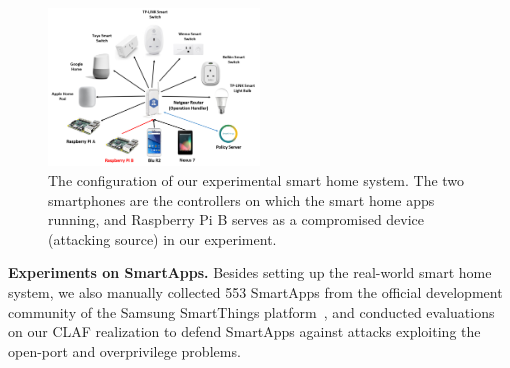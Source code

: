 \documentclass[letterpaper,12pt]{article}
\begin{document}
\begin{figure}[!htb]
        \centering
        \includegraphics[width=0.5\textwidth]{smarthomesys.png}
        \caption{The configuration of our experimental smart home system. The two smartphones are the controllers on which the smart home apps running, and Raspberry Pi B serves as a compromised device (attacking source) in our experiment.}
        \label{fig:smarthomesys}
\end{figure}

\textbf{Experiments on SmartApps.} 
Besides setting up the real-world smart home system, we also manually collected 553 SmartApps from the official development community of the Samsung SmartThings platform~\cite{smartthingscommunity}, and conducted evaluations on our CLAF realization to defend SmartApps against attacks exploiting the open-port and overprivilege problems.
\end{document}
